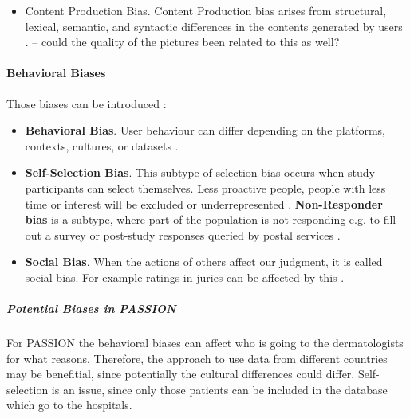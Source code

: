 \begin{refsection}
\begin{itemize}
			\item Content Production Bias. Content Production bias arises from structural, lexical, semantic, and syntactic differences in the contents generated by users \autocite{M120_Olteanu_2019}. \autocite{Mehrabi_2021} -- could the quality of the pictures been related to this as well?	
			\rawcitationusedend
		\end{itemize}
		\rawcitationend
		
		\paragraph{Behavioral Biases}
		
		Those biases can be introduced :
		\begin{itemize}
			\item \textbf{Behavioral Bias}. User behaviour can differ depending on the platforms, contexts, cultures, or datasets \autocite{M120_Olteanu_2019}.
			\item \textbf{Self-Selection Bias}. This subtype of selection bias occurs when study participants can select themselves. Less proactive people, people with less time or interest will be excluded or underrepresented \autocites{Mester_2022}{Mehrabi_2021}. \textbf{Non-Responder bias} is a subtype, where part of the population is not responding e.g. to fill out a survey or post-study responses queried by postal services \autocite{Chakraborty_2024}. 
			\item \textbf{Social Bias}. When the actions of others affect our judgment, it is called social bias. For example ratings in juries can be affected by this \autocite{M9_Baeza-Yates_2018}.
		\end{itemize}
		
		
		\subparagraph{Potential Biases in PASSION}
		For PASSION the behavioral biases can affect who is going to the dermatologists for what reasons. Therefore, the approach to use data from different countries may be benefitial, since potentially the cultural differences could differ.
		Self-selection is an issue, since only those patients can be included in the database which go to the hospitals.
		
		
		

\end{refsection}
